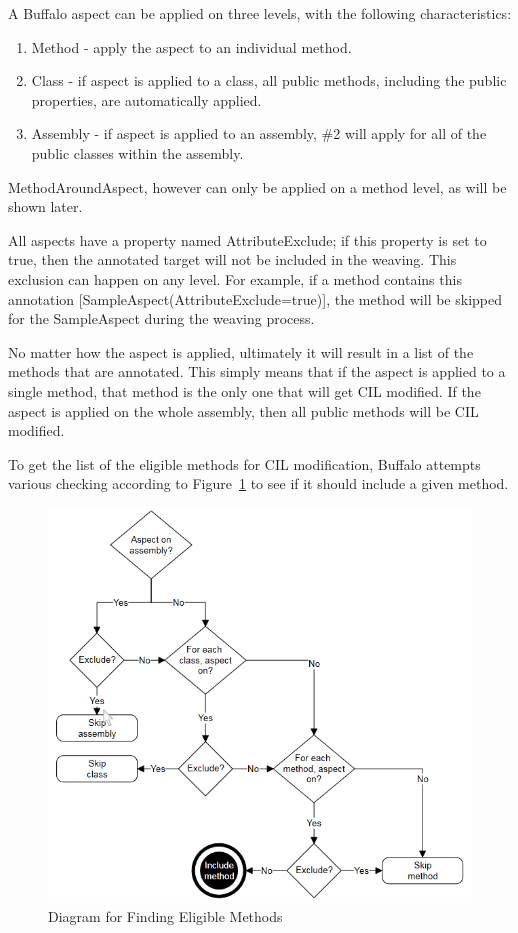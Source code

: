 A Buffalo aspect can be applied on three levels, with the following characteristics:

\begin{enumerate}
  \item Method - apply the aspect to an individual method.
  \item Class - if aspect is applied to a class, all public methods, including the public properties, are automatically applied.
  \item Assembly - if aspect is applied to an assembly, \#2 will apply for all of the public classes within the assembly.
\end{enumerate}

MethodAroundAspect, however can only be applied on a method level, as will be shown later.

All aspects have a property named AttributeExclude; if this property is set to true, then the annotated target will not be included in the weaving. This exclusion can happen on any level. For example, if a method contains this annotation [SampleAspect(AttributeExclude=true)], the method will be skipped for the SampleAspect during the weaving process.

No matter how the aspect is applied, ultimately it will result in a list of the methods that are annotated. This simply means that if the aspect is applied to a single method, that method is the only one that will get CIL modified. If the aspect is applied on the whole assembly, then all public methods will be CIL modified.

To get the list of the eligible methods for CIL modification, Buffalo attempts various checking according to Figure~\ref{logical_inclusion} to see if it should include a given method.

\begin{figure}[H]
  \includegraphics[scale=1.0]{AspectLogicalInclusion2.PNG}
  \centering
  \caption{Diagram for Finding Eligible Methods\label{logical_inclusion}}
\end{figure}

